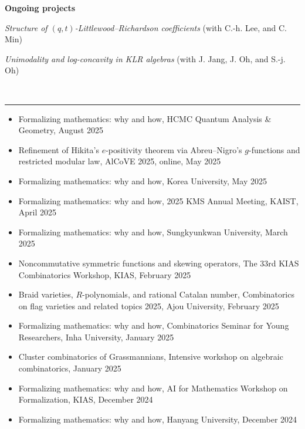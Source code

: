 \documentclass[letterpaper,11pt]{article}
\newcommand{\resheading}[1]{
	\vspace{5pt}
	\textbf{\sffamily{\mbox{~}\makebox[6.762in][l]{\large #1} \vphantom{p\^{E}}}} \\[-6pt]
	\par\noindent\rule{\textwidth}{0.4pt}
}
\begin{document}
{\bf Ongoing projects}
\begin{etaremune}
  \item \emph{Structure of {$(q,t)$}-Littlewood--Richardson coefficients} (with C.-h. Lee, and C. Min)
  \item \emph{Unimodality and log-concavity in KLR algebras} (with J. Jang, J. Oh, and S.-j. Oh)
\end{etaremune}


\resheading{Presentations}
\begin{itemize}
  \item Formalizing mathematics: why and how, HCMC Quantum Analysis \& Geometry, August 2025

  \item Refinement of Hikita's $e$-positivity theorem via Abreu--Nigro's $g$-functions and restricted modular law, AlCoVE 2025, online, May 2025
  
  \item Formalizing mathematics: why and how, Korea University, May 2025
  
  \item Formalizing mathematics: why and how, 2025 KMS Annual Meeting, KAIST, April 2025
  
  \item Formalizing mathematics: why and how, Sungkyunkwan University, March 2025
  
  \item Noncommutative symmetric functions and skewing operators, The 33rd KIAS Combinatorics Workshop, KIAS, February 2025
  
  \item Braid varieties, \( R \)-polynomials, and rational Catalan number, Combinatorics on flag varieties and related topics 2025, Ajou University, February 2025
  
  \item Formalizing mathematics: why and how, Combinatorics Seminar for Young Researchers, Inha University, January 2025
  
  \item Cluster combinatorics of Grassmannians, Intensive workshop on algebraic combinatorics, January 2025
  
  \item Formalizing mathematics: why and how, AI for Mathematics Workshop on Formalization, KIAS, December 2024
  
  \item Formalizing mathematics: why and how, Hanyang University, December 2024


\end{itemize}
\end{document}
